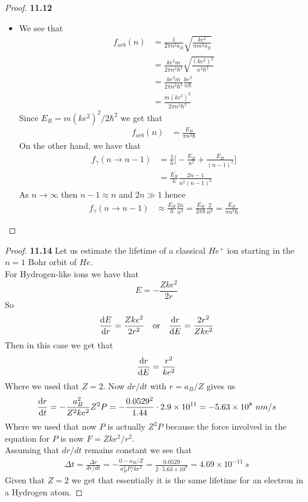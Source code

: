 \documentclass[11pt]{article}
\newcommand{\sci}[1]{\times 10^{#1}}
\theoremstyle{definition}
\begin{document}
\begin{proof}{\textbf{11.12}}
\begin{itemize}
\item[\textbf{(c)}] We see that
\begin{align*}
    f_{orb}(n) &= \frac{1}{2\pi n^2a_B}\sqrt{\frac{ke^2}{mn^2a_B}} \\
    &= \frac{ke^2 m}{2\pi n^2\hbar^2}\sqrt{\frac{(ke^2)^2}{n^2\hbar^2}} \\
    &= \frac{ke^2 m}{2\pi n^2\hbar^2}\frac{ke^2}{n\hbar} \\
    &= \frac{m(ke^2)^2}{2\pi n^3\hbar^3}
\end{align*}
Since $E_R = m (ke^2)^2/2\hbar^2$ we get that
\begin{align*}
    f_{orb}(n)
    &= \frac{E_R}{\pi n^3\hbar}
\end{align*}
On the other hand, we have that
\begin{align*}
    f_\gamma(n \to n-1)
    &= \frac{1}{h}\bigg[-\frac{E_R}{n^2} +\frac{E_R}{(n-1)^2}\bigg] \\
    &= \frac{E_R}{h}\frac{2n - 1}{n^2(n-1)^2}
\end{align*}
As $n \to \infty$ then $n-1 \approx n$ and $2n \gg 1$ hence
\begin{align*}
    f_\gamma(n \to n-1)
    &\approx \frac{E_R}{h}\frac{2n}{n^4}
    = \frac{E_R}{2\pi \hbar}\frac{2}{n^3}
    = \frac{E_R}{\pi n^3 \hbar}
\end{align*}
\end{itemize}
\end{proof}

\cleardoublepage
\begin{proof}{\textbf{11.14}}
Let us estimate the lifetime of a classical $He^+$ ion starting in the $n = 1$
Bohr orbit of $He$.\\
For Hydrogen-like ions we have that
$$E = -\frac{Zke^2}{2r}$$
So 
\begin{align*}
    \dv{E}{r} = \frac{Zke^2}{2r^2}
    \quad\text{or}\quad
    \dv{r}{E} = \frac{2r^2}{Zke^2}
\end{align*}
Then in this case we get that
\begin{align*}
    \dv{r}{E} = \frac{r^2}{ke^2}
\end{align*}
Where we used that $Z = 2$.
Now $dr/dt$ with $r = a_B/Z$ gives us
\begin{align*}
    \dv{r}{t} = -\frac{a_B^2}{Z^2ke^2}Z^2P 
    = -\frac{0.0529^2}{1.44} \cdot 2.9\sci{11}
    = -5.63\sci{8}~nm/s
\end{align*}
Where we used that now $P$ is actually $Z^2 P$ because the force involved in
the equation for $P$ is now $F = Z ke^2/r^2$.\\
Assuming that $dr/dt$ remains constant we see that
\begin{align*}
    \Delta t = \frac{\Delta r}{dr/dt} = -\frac{0 - a_B/Z}{a_B^2P/ke^2}
    = \frac{0.0529}{2\cdot 5.63\sci{8}} 
    = 4.69\sci{-11}~s
\end{align*}
Given that $Z = 2$ we get that essentially it is the same lifetime for an
electron in a Hydrogen atom.
\end{proof}
\end{document}
